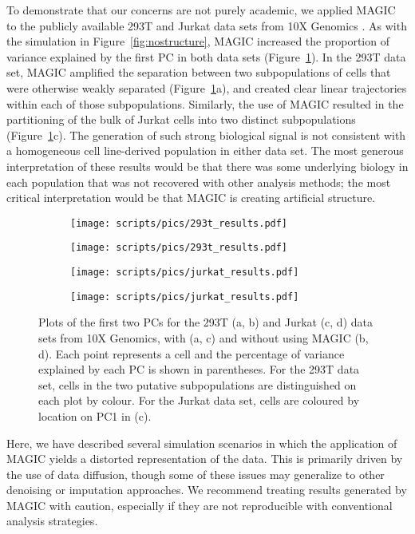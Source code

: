 \documentclass[10pt,letterpaper]{article}
\begin{document}
To demonstrate that our concerns are not purely academic, we applied MAGIC to the publicly available 293T and Jurkat data sets from 10X Genomics \cite{zheng2017massively}.
As with the simulation in Figure~\ref{fig:nostructure}, MAGIC increased the proportion of variance explained by the first PC in both data sets (Figure~\ref{fig:realdata}).
In the 293T data set, MAGIC amplified the separation between two subpopulations of cells that were otherwise weakly separated (Figure~\ref{fig:realdata}a),
and created clear linear trajectories within each of those subpopulations.
Similarly, the use of MAGIC resulted in the partitioning of the bulk of Jurkat cells into two distinct subpopulations (Figure~\ref{fig:realdata}c).
The generation of such strong biological signal is not consistent with a homogeneous cell line-derived population in either data set.
The most generous interpretation of these results would be that there was some underlying biology in each population that was not recovered with other analysis methods;
the most critical interpretation would be that MAGIC is creating artificial structure.

\begin{figure}[btp]
\centering
\begin{subfigure}[b]{0.49\textwidth}
    \texttt{[image: scripts/pics/293t\_results.pdf]}
    \caption{}
\end{subfigure}
\begin{subfigure}[b]{0.49\textwidth}
    \texttt{[image: scripts/pics/293t\_results.pdf]}
    \caption{}
\end{subfigure}
\begin{subfigure}[b]{0.49\textwidth}
    \texttt{[image: scripts/pics/jurkat\_results.pdf]}
    \caption{}
\end{subfigure}
\begin{subfigure}[b]{0.49\textwidth}
    \texttt{[image: scripts/pics/jurkat\_results.pdf]}
    \caption{}
\end{subfigure}
\caption{Plots of the first two PCs for the 293T (a, b) and Jurkat (c, d) data sets from 10X Genomics, with (a, c) and without using MAGIC (b, d).
Each point represents a cell and the percentage of variance explained by each PC is shown in parentheses.
For the 293T data set, cells in the two putative subpopulations are distinguished on each plot by colour.
For the Jurkat data set, cells are coloured by location on PC1 in (c).}
\label{fig:realdata}
\end{figure}

Here, we have described several simulation scenarios in which the application of MAGIC yields a distorted representation of the data.
This is primarily driven by the use of data diffusion, though some of these issues may generalize to other denoising or imputation approaches.
We recommend treating results generated by MAGIC with caution, especially if they are not reproducible with conventional analysis strategies.



\end{document}
